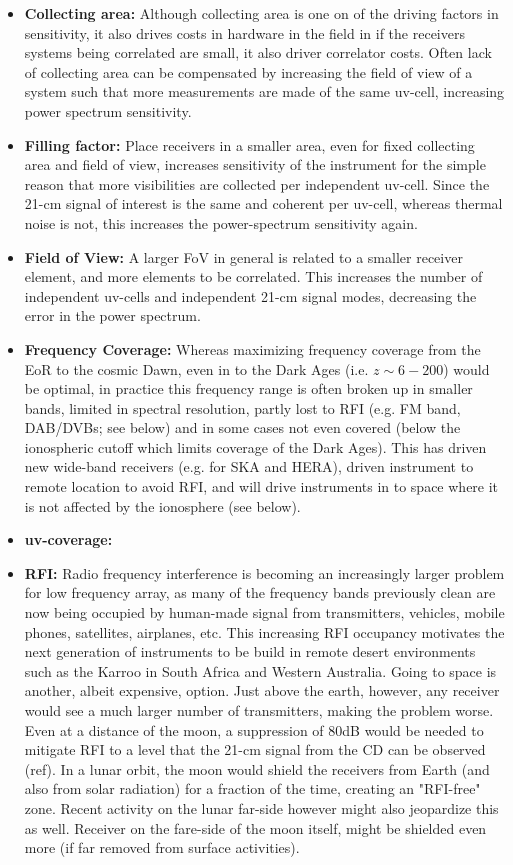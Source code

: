 \begin{itemize}
    \item {\bf Collecting area:} Although collecting area is one on of the driving factors in sensitivity, it also drives costs in hardware in the field in if the receivers systems being correlated are small, it also driver correlator costs. Often lack of collecting area can be compensated by increasing the field of view of a system such that more measurements are made of the same uv-cell, increasing power spectrum sensitivity.
    \item {\bf Filling factor:} Place receivers in a smaller area, even for fixed collecting area and field of view, increases sensitivity of the instrument for the simple reason that more visibilities are collected per independent uv-cell. Since the 21-cm signal of interest is the same and coherent per uv-cell, whereas thermal noise is not, this increases the power-spectrum sensitivity again.
    \item {\bf Field of View:} A larger FoV in general is related to a smaller receiver element, and more elements to be correlated. This increases the number of independent uv-cells and independent 21-cm signal modes, decreasing the error in the power spectrum.
    \item {\bf Frequency Coverage:} Whereas maximizing frequency coverage from the EoR to the cosmic Dawn, even in to the Dark Ages (i.e. $z\sim 6 - 200$) would be optimal, in practice this frequency range is often broken up in smaller bands, limited in spectral resolution, partly lost to RFI (e.g. FM band, DAB/DVBs; see below) and in some cases not even covered (below the ionospheric cutoff which limits coverage of the Dark Ages). This has driven new wide-band receivers (e.g. for SKA and HERA), driven instrument to remote location to avoid RFI, and will drive instruments in to space where it is not affected by the ionosphere (see below). 
    \item {\bf uv-coverage:} 
    \item {\bf RFI:} Radio frequency interference is becoming an increasingly larger problem for low frequency array, as many of the frequency bands previously clean are now being occupied by human-made signal from transmitters, vehicles, mobile phones, satellites, airplanes, etc. This increasing RFI occupancy motivates the next generation of instruments to be build in remote desert environments such as the Karroo in South Africa and Western Australia. Going to space is another, albeit expensive, option. Just above the earth, however, any receiver would see a much larger number of transmitters, making the problem worse. Even at a distance of the moon, a suppression of 80dB would be needed to mitigate RFI to a level that the 21-cm signal from the CD can be observed (ref). In a lunar orbit, the moon would shield the receivers from Earth (and also from solar radiation) for a fraction of the time, creating an "RFI-free" zone. Recent activity on the lunar far-side however might also jeopardize this as well. Receiver on the fare-side of the moon itself, might be shielded even more (if far removed from surface activities).      

\end{itemize}
